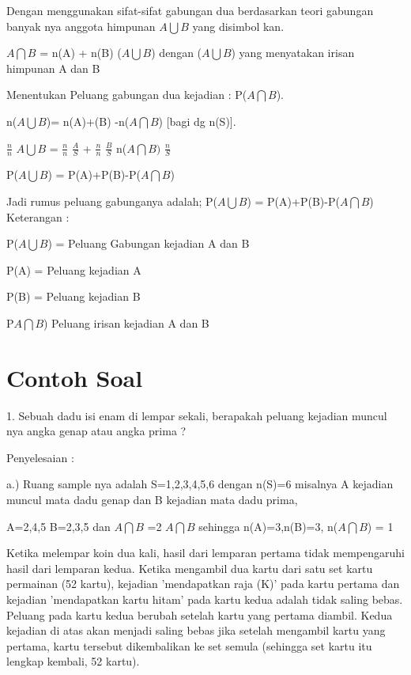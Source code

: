 \documentclass[11pt,fleqn]{book} %
\begin{document}
{Dengan menggunakan sifat-sifat gabungan dua berdasarkan teori gabungan banyak nya anggota himpunan $A\bigcup B$ yang disimbol kan.



$A\bigcap B$ = n(A) + n(B) ($A\bigcup B$) dengan  ($A\bigcup B$) yang menyatakan irisan himpunan A dan B

Menentukan Peluang gabungan dua kejadian : P($A\bigcap B$).

n($A\bigcup B$)= n(A)+(B) -n($A\bigcap B$) [bagi dg n(S)]. 

$\frac{n}{n}$ $A\bigcup B$ = $\frac{n}{n}$ $\frac{A}{S}$ + $\frac{n}{n}$ $\frac{B}{S}$ n($A\bigcap B)$ $\frac{n}S$

P($A\bigcup B$) = P(A)+P(B)-P($A\bigcap B$)

Jadi rumus peluang gabunganya adalah;
P($A\bigcup B$) = P(A)+P(B)-P($A\bigcap B$)
Keterangan :

P($A\bigcup B$) = Peluang Gabungan kejadian A dan B

P(A) = Peluang kejadian A

P(B) = Peluang kejadian B

P$A\bigcap B$) Peluang irisan kejadian A dan B



\section{Contoh Soal}

1. Sebuah dadu isi enam di lempar sekali, berapakah peluang kejadian muncul nya angka genap atau angka prima ? 

Penyelesaian :

a.) Ruang sample nya adalah S={1,2,3,4,5,6} dengan n(S)=6
misalnya A kejadian muncul mata dadu genap dan B kejadian mata dadu prima,

A={2,4,5} B={2,3,5} dan $A\bigcap B$ ={2}
$A\bigcap B$
sehingga n(A)=3,n(B)=3, n($A\bigcap B$) = 1

Ketika melempar koin dua kali, hasil dari lemparan pertama tidak mempengaruhi hasil dari lemparan kedua.
\vspace{1cm} 
Ketika mengambil dua kartu dari satu set kartu permainan (52 kartu), kejadian 'mendapatkan raja (K)' pada kartu pertama dan kejadian 'mendapatkan kartu hitam' pada kartu kedua adalah tidak saling bebas. Peluang pada kartu kedua berubah setelah kartu yang pertama diambil. Kedua kejadian di atas akan menjadi saling bebas jika setelah mengambil kartu yang pertama, kartu tersebut dikembalikan ke set semula (sehingga set kartu itu lengkap kembali, 52 kartu).
\vspace{1cm} 

}
\end{document}
